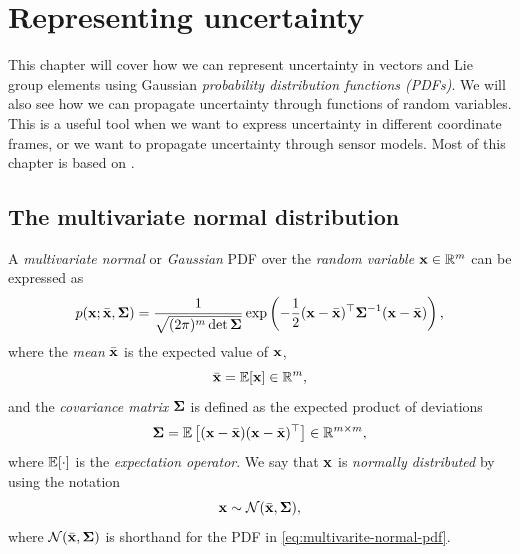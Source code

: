 \chapter{Representing uncertainty} \label{ch:uncertainty}
This chapter will cover how we can represent uncertainty in vectors and Lie group elements using Gaussian \emph{probability distribution functions (PDFs)}.
We will also see how we can propagate uncertainty through functions of random variables.
This is a useful tool when we want to express uncertainty in different coordinate frames, or we want to propagate uncertainty through sensor models.
Most of this chapter is based on \cite{barfoot2017state, SolaARobotics}.

\section{The multivariate normal distribution}
A \emph{multivariate normal} or \emph{Gaussian} PDF over the \emph{random variable} ${\boldsymbol{\mathbf{x}}} \in {\mathbb R}^m$ can be expressed as
\begin{equation} \label{eq:multivarite-normal-pdf}
  p({\boldsymbol{\mathbf{x}}}; \bar{{\boldsymbol{\mathbf{x}}}}, {\boldsymbol{\mathbf{\Sigma}}}) = \frac{1}{\sqrt{(2\pi)^m \det {\boldsymbol{\mathbf{\Sigma}}}}} \exp \left( -\frac{1}{2} ({\boldsymbol{\mathbf{x}}} - \bar{{\boldsymbol{\mathbf{x}}}})^{\top} {\boldsymbol{\mathbf{\Sigma}}}^{-1} ({\boldsymbol{\mathbf{x}}} - \bar{{\boldsymbol{\mathbf{x}}}}) \right),
\end{equation}
where the \emph{mean} $\bar{{\boldsymbol{\mathbf{x}}}}$ is the expected value of ${\boldsymbol{\mathbf{x}}}$,
\begin{equation} \label{eq:mean-def}
  \bar{{\boldsymbol{\mathbf{x}}}} = {\mathbb E}[{\boldsymbol{\mathbf{x}}}] \in {\mathbb R}^m,
\end{equation}
and the \emph{covariance matrix} ${\boldsymbol{\mathbf{\Sigma}}}$ is defined as the expected product of deviations
\begin{equation} \label{eq:cov-def}
  {\boldsymbol{\mathbf{\Sigma}}} = {\mathbb E} \left[({\boldsymbol{\mathbf{x}}} - \bar{{\boldsymbol{\mathbf{x}}}}) ({\boldsymbol{\mathbf{x}}} - \bar{{\boldsymbol{\mathbf{x}}}})^{\top} \right] \in {\mathbb R}^{m \times m},
\end{equation}
where ${\mathbb E}[\cdot]$ is the \emph{expectation operator}.
We say that ${\boldsymbol{\mathbf{x}}}$ is \emph{normally distributed} by using the notation
\begin{equation}
  {\boldsymbol{\mathbf{x}}} \sim \mathcal{N}(\bar{{\boldsymbol{\mathbf{x}}}}, {\boldsymbol{\mathbf{\Sigma}}}),
\end{equation}
where $\mathcal{N}(\bar{{\boldsymbol{\mathbf{x}}}}, {\boldsymbol{\mathbf{\Sigma}}})$ is shorthand for the PDF in \eqref{eq:multivarite-normal-pdf}.

